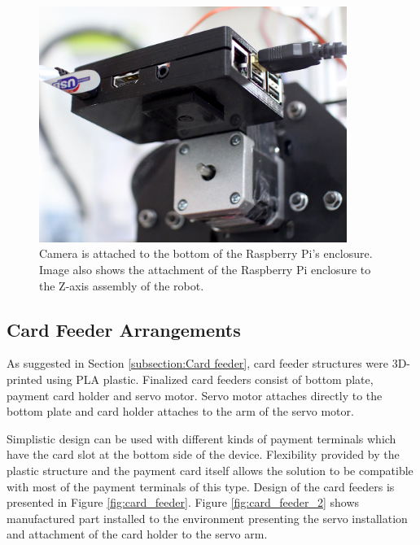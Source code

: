 \begin{figure}[ht]
  \begin{center}
    \includegraphics[width=10cm]{images/camera.jpg}
    \caption{Camera is attached to the bottom of the Raspberry Pi's enclosure. Image also shows the attachment of the Raspberry Pi enclosure to the Z-axis assembly of the robot.}
    \label{fig:camera}
  \end{center}
\end{figure}
\FloatBarrier


\subsection{Card Feeder Arrangements}
\label{subsection:Card feeder arrangements}

As suggested in Section \ref{subsection:Card feeder}, card feeder structures were 3D-printed using PLA plastic. Finalized card feeders consist of bottom plate, payment card holder and servo motor. Servo motor attaches directly to the bottom plate and card holder attaches to the arm of the servo motor.

Simplistic design can be used with different kinds of payment terminals which have the card slot at the bottom side of the device. Flexibility provided by the plastic structure and the payment card itself allows the solution to be compatible with most of the payment terminals of this type. Design of the card feeders is presented in Figure \ref{fig:card_feeder}. Figure \ref{fig:card_feeder_2} shows manufactured part installed to the environment presenting the servo installation and attachment of the card holder to the servo arm.

